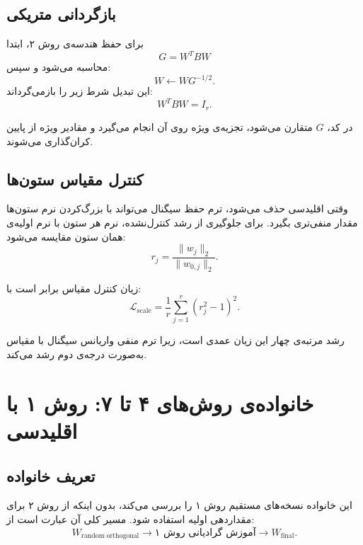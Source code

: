 \documentclass[a4paper,12pt]{article}
\newcommand{\QR}{\lr{QR}}
\begin{document}
\subsection{بازگردانی متریکی}

برای حفظ هندسه‌ی روش ۲، ابتدا
\begin{equation}
 G=W^{T}BW
\end{equation}
محاسبه می‌شود و سپس:
\begin{equation}
 W\leftarrow WG^{-1/2}.
\end{equation}
این تبدیل شرط زیر را بازمی‌گرداند:
\begin{equation}
 W^{T}BW=I_r.
\end{equation}

در کد، $G$ متقارن می‌شود، تجزیه‌ی ویژه روی آن انجام می‌گیرد و مقادیر ویژه از پایین کران‌گذاری می‌شوند.

\subsection{کنترل مقیاس ستون‌ها}

وقتی \QR{} اقلیدسی حذف می‌شود، ترم حفظ سیگنال می‌تواند با بزرگ‌کردن نرم ستون‌ها مقدار منفی‌تری بگیرد. برای جلوگیری از رشد کنترل‌نشده، نرم هر ستون با نرم اولیه‌ی همان ستون مقایسه می‌شود:
\begin{equation}
 r_j
 =
 \frac{\lVert w_j\rVert_2}{\lVert w_{0,j}\rVert_2}.
\end{equation}

زیان کنترل مقیاس برابر است با:
\begin{equation}
 \mathcal{L}_{\mathrm{scale}}
 =
 \frac{1}{r}
 \sum_{j=1}^{r}
 \left(r_j^2-1\right)^2.
\end{equation}

رشد مرتبه‌ی چهار این زیان عمدی است، زیرا ترم منفی واریانس سیگنال با مقیاس به‌صورت درجه‌ی دوم رشد می‌کند.

\section{خانواده‌ی روش‌های ۴ تا ۷: روش ۱ با \QR{} اقلیدسی}

\subsection{تعریف خانواده}

این خانواده نسخه‌های مستقیم روش ۱ را بررسی می‌کند، بدون اینکه از روش ۲ برای مقداردهی اولیه استفاده شود. مسیر کلی آن عبارت است از:
\begin{equation}
 W_{\mathrm{random\;orthogonal}}
 \longrightarrow
 \text{آموزش گرادیانی روش ۱}
 \longrightarrow
 W_{\mathrm{final}}.
\end{equation}
\end{document}
